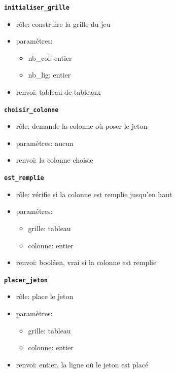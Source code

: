 \documentclass[svgnames,11pt]{beamer}
\begin{document}
\begin{frame}

    {\Large \textbf{\texttt{initialiser\_grille}}}
    \begin{itemize}
        \item rôle: construire la grille du jeu
        \item paramètres:
        \begin{itemize}
            \item nb\_col: entier
            \item nb\_lig: entier
        \end{itemize}
        \item renvoi: tableau de tableaux
    \end{itemize}

\end{frame}
\begin{frame}

    {\Large \textbf{\texttt{choisir\_colonne}}}
    \begin{itemize}
        \item rôle: demande la colonne où poser le jeton
        \item paramètres: aucun
        \item renvoi: la colonne choisie
    \end{itemize}

\end{frame}
\begin{frame}

    {\Large \textbf{\texttt{est\_remplie}}}
    \begin{itemize}
        \item rôle: vérifie si la colonne est remplie jusqu'en haut
        \item paramètres:
        \begin{itemize}
            \item grille: tableau
            \item colonne: entier
        \end{itemize}
        \item renvoi: booléen, vrai si la colonne est remplie
    \end{itemize}

\end{frame}
\begin{frame}

    {\Large \textbf{\texttt{placer\_jeton}}}
    \begin{itemize}
        \item rôle: place le jeton 
        \item paramètres:
        \begin{itemize}
            \item grille: tableau
            \item colonne: entier
        \end{itemize}
        \item renvoi: entier, la ligne où le jeton est placé
    \end{itemize}

\end{frame}
\end{document}
